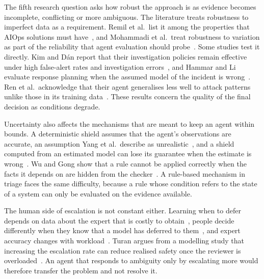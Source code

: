 The fifth research question asks how robust the approach is as evidence becomes incomplete, conflicting or more ambiguous. The literature treats robustness to imperfect data as a requirement. Remil et al.\ list it among the properties that AIOps solutions must have~\cite{remil2024}, and Mohammadi et al.\ treat robustness to variation as part of the reliability that agent evaluation should probe~\cite{mohammadi2025}. Some studies test it directly. Kim and D\'{a}n report that their investigation policies remain effective under high false-alert rates and investigation errors~\cite{kim2025}, and Hammar and Li evaluate response planning when the assumed model of the incident is wrong~\cite{hammar2025}. Ren et al.\ acknowledge that their agent generalises less well to attack patterns unlike those in its training data~\cite{ren2025}. These results concern the quality of the final decision as conditions degrade.

Uncertainty also affects the mechanisms that are meant to keep an agent within bounds. A deterministic shield assumes that the agent's observations are accurate, an assumption Yang et al.\ describe as unrealistic~\cite{yang2023}, and a shield computed from an estimated model can lose its guarantee when the estimate is wrong~\cite{hamel2026}. Wu and Gong show that a rule cannot be applied correctly when the facts it depends on are hidden from the checker~\cite{wugong2026}. A rule-based mechanism in triage faces the same difficulty, because a rule whose condition refers to the state of a system can only be evaluated on the evidence available.

The human side of escalation is not constant either. Learning when to defer depends on data about the expert that is costly to obtain~\cite{hemmer2023}, people decide differently when they know that a model has deferred to them~\cite{bondi2022}, and expert accuracy changes with workload~\cite{zhang2026falcon}. Turan argues from a modelling study that increasing the escalation rate can reduce realised safety once the reviewer is overloaded~\cite{turan2026}. An agent that responds to ambiguity only by escalating more would therefore transfer the problem and not resolve it.

